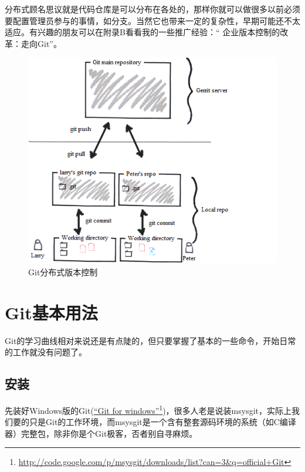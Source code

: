 分布式顾名思议就是代码仓库是可以分布在各处的，那样你就可以做很多以前必须要配置管理员参与的事情，如分支。当然它也带来一定的复杂性，早期可能还不太适应。有兴趣的朋友可以在附录B看看我的一些推广经验：“
企业版本控制的改革：走向Git”。

\begin{figure}[htbp]
\centering
\includegraphics[keepaspectratio,width=\textwidth,height=0.75\textheight]{img/18333fig0201-tn.png}
\caption{Git分布式版本控制}
\end{figure}

\section{Git基本用法}
\label{git基本用法}

Git的学习曲线相对来说还是有点陡的，但只要掌握了基本的一些命令，开始日常的工作就没有问题了。

\subsection{安装}
\label{安装}

先装好Windows版的Git(\href{http://code.google.com/p/msysgit/downloads/list?can=3&q=official+Git}{``Git for windows''}\footnote{\href{http://code.google.com/p/msysgit/downloads/list?can=3\&q=official+Git}{http:/\slash code.google.com\slash p\slash msysgit\slash downloads\slash list?can=3\&q=official+Git}})，很多人老是说装msysgit，实际上我们要的只是Git的工作环境，而msysgit是一个含有整套源码环境的系统（如C编译器）完整包，除非你是个Git极客，否者别自寻麻烦。

